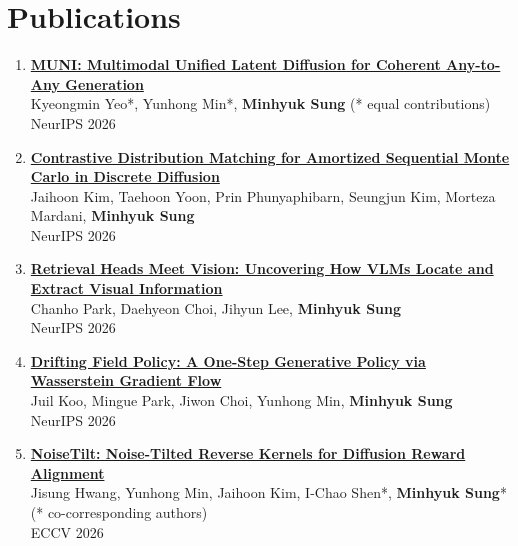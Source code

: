 \documentclass[letterpaper,10pt]{article} %
\newcommand{\blankline}{\quad\pagebreak[2]}
\begin{document}
\blankline



\section{Publications}

\begin{enumerate}

\item \label{neurips26_4}
\href{https://arxiv.org/abs/2606.16408}{\textbf{MUNI: Multimodal Unified Latent Diffusion for Coherent Any-to-Any Generation}}\\
Kyeongmin Yeo*, Yunhong Min*, \textbf{Minhyuk Sung} (* equal contributions)\\
NeurIPS 2026\\
\blankline

\item \label{neurips26_3}
\href{https://arxiv.org/abs/2605.23346}{\textbf{Contrastive Distribution Matching for Amortized Sequential Monte Carlo in Discrete Diffusion}}\\
Jaihoon Kim, Taehoon Yoon, Prin Phunyaphibarn, Seungjun Kim, Morteza Mardani, \textbf{Minhyuk Sung}\\
NeurIPS 2026\\
\blankline

\item \label{neurips26_2}
\href{https://arxiv.org/abs/2608.27417}{\textbf{Retrieval Heads Meet Vision: Uncovering How VLMs Locate and Extract Visual Information}}\\
Chanho Park, Daehyeon Choi, Jihyun Lee, \textbf{Minhyuk Sung}\\
NeurIPS 2026\\
\blankline

\item \label{neurips26_1}
\href{https://arxiv.org/abs/2605.07727}{\textbf{Drifting Field Policy: A One-Step Generative Policy via Wasserstein Gradient Flow}}\\
Juil Koo, Mingue Park, Jiwon Choi, Yunhong Min, \textbf{Minhyuk Sung}\\
NeurIPS 2026\\
\blankline

\item \label{eccv26_2}
\href{https://arxiv.org/abs/2606.18066}{\textbf{NoiseTilt: Noise-Tilted Reverse Kernels for Diffusion Reward Alignment}}\\
Jisung Hwang, Yunhong Min, Jaihoon Kim, I-Chao Shen*, \textbf{Minhyuk Sung}* (* co-corresponding authors)\\
ECCV 2026\\
\blankline


\end{enumerate}
\end{document}
